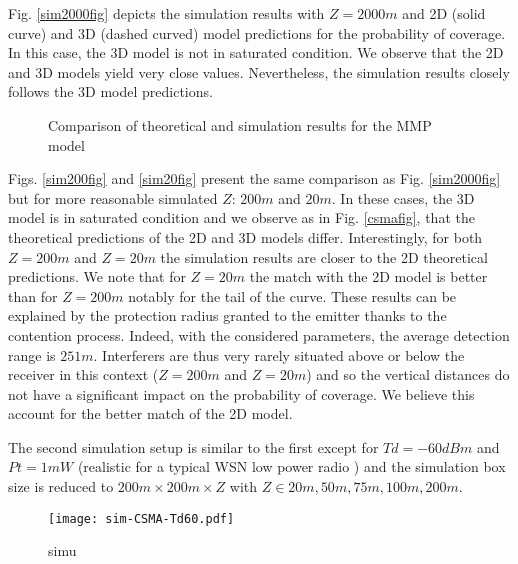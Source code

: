 \documentclass{sig-alternate-05-2015}
\begin{document}
Fig. \ref{sim2000fig} depicts the simulation results  with $Z=2000m$ and 2D (solid curve) and 3D (dashed curved) model predictions for the probability of coverage. In this case, the 3D model is not in saturated condition. We observe that the 2D and 3D models yield very close values. Nevertheless, the simulation results closely follows the 3D model predictions.

\begin{figure*}[ht]
        \centering

        \caption{Comparison of theoretical and simulation results for the MMP model}
\end{figure*}

Figs. \ref{sim200fig} and \ref{sim20fig} present the same comparison as Fig. \ref{sim2000fig} but for more reasonable simulated $Z$: $200m$ and $20m$. In these cases, the 3D model is in saturated condition and we observe as in Fig. \ref{csmafig}, that the theoretical predictions of the 2D and 3D models differ. Interestingly, for both $Z=200m$ and $Z=20m$ the simulation results are closer to the 2D theoretical predictions. We note that for $Z=20m$ the match with the 2D model is better than for $Z=200m$ notably for the tail of the curve. These results can be explained by the protection radius granted to the emitter thanks to the contention process. Indeed, with the considered parameters, the average detection range is $251m$. Interferers are thus very rarely situated above or below the receiver in this context ($Z=200m$ and $Z=20m$) and so the vertical distances do not have a significant impact on the probability of coverage. We believe this account for the better match of the 2D model.

The second simulation setup is similar to the first except for $Td=-60dBm$ and $Pt=1mW$ (realistic for a typical WSN low power radio \cite{cc1100}) and the simulation box size is reduced to $200m\times 200m \times Z$ with $Z\in {20m,50m,75m,100m,200m}$.

\begin{figure}[ht]
  \centering
  \texttt{[image: sim-CSMA-Td60.pdf]}
  \caption{simu}
  \label{sim2Td60fig}
\end{figure}
\end{document}
